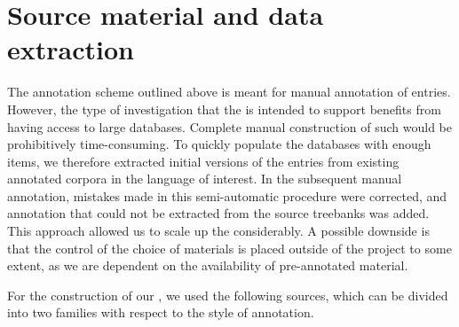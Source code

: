 \documentclass[output=paper,colorlinks,citecolor=brown]{langscibook}
\begin{document}
\section{Source material and data extraction}
\label{sec:sources}
\begin{sloppypar}
The annotation scheme outlined above is meant for manual annotation of  entries. However, the type of investigation that the  is intended to support benefits from having access to large databases. Complete manual construction of such  would be prohibitively time-consuming. To quickly populate the databases with enough items, we therefore extracted initial versions of the  entries from existing annotated corpora in the language of interest. In the subsequent manual annotation, mistakes made in this semi-automatic procedure were corrected, and annotation that could not be extracted from the source treebanks was added. This approach allowed us to scale up the  considerably. A possible downside is that the control of the choice of materials is placed outside of the project to some extent, as we are dependent on the availability of pre-annotated material. 
\end{sloppypar}

For the construction of our , we
used the following sources, which can be divided into two families
with respect to the style of annotation.
\end{document}
